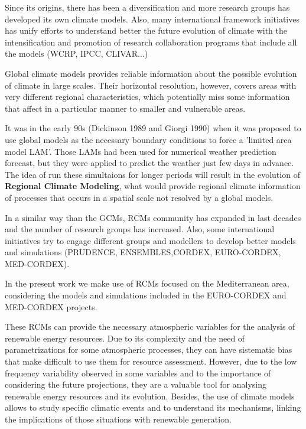 Since its origins, there has been a diversification and more research groups has developed its own climate models. Also, many international framework initiatives has unify efforts to understand better the future evolution of climate with the intensification and promotion of research collaboration programs that include all the models (WCRP, IPCC, CLIVAR...)   

Global climate models provides reliable information about the possible evolution of climate in large scales. Their horizontal resolution, however, covers areas with very different regional characteristics, which potentially miss some information that affect in a particular manner to smaller and vulnerable areas.

It was in the early 90s (Dickinson 1989 and Giorgi 1990) when it was proposed to use global models as the necessary boundary conditions to force a 'limited area model LAM'. Those LAMs had been used for numerical weather prediction forecast, but they were applied to predict the weather just few days in advance. The idea of run these simultaions for longer periods will result in the evolution of \textbf{Regional Climate Modeling}, what would provide regional climate information of processes that occurs in a spatial scale not resolved by a global models.

In a similar way than the GCMs, RCMs community has expanded in last decades and the number of research groups has increased. Also, some international initiatives try to engage different groups and modellers to develop better models and simulations (PRUDENCE, ENSEMBLES,CORDEX, EURO-CORDEX, MED-CORDEX).

In the present work we make use of RCMs focused on the Mediterranean area, considering the models and simulations included in the EURO-CORDEX and MED-CORDEX projects.

These RCMs can provide the necessary atmospheric variables for the analysis of renewable energy resources. Due to its complexity and the need of parametrizations for some atmospheric processes, they can have sistematic bias that make difficult to use them for resource assessment. However, due to the low frequency variability observed in some variables and to the importance of considering the future projections, they are a valuable tool for analysing renewable energy resources and its evolution. Besides, the use of climate models allows to study specific climatic events and to understand its mechanisms, linking the implications of those situations with renewable generation.

